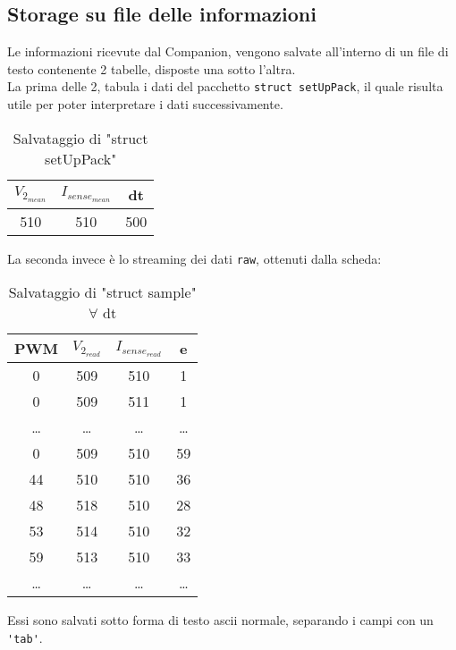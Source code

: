 \subsection{Storage su file delle informazioni}\label{subsec:experimentStorage}
Le informazioni ricevute dal Companion, vengono salvate all'interno di un file di testo contenente 2 tabelle, disposte una sotto l'altra.\\
La prima delle 2, tabula i dati del pacchetto \verb|struct setUpPack|, il quale risulta utile per poter interpretare i dati successivamente.
\begin{table}[h]
	\centering
	\caption[Salvataggio di "struct setUpPack"]{Salvataggio di "struct setUpPack"}
	\begin{tabular}[t]{|c|c|c|}
		\hline
		$ V_{2_{mean}} $ & $ I_{sense_{mean}}$ & dt  \\
		\hline
		510              & 510                 & 500 \\
		\hline
	\end{tabular}
\end{table}

\noindent
La seconda invece è lo streaming dei dati \verb|raw|, ottenuti dalla scheda:
\begin{table}[h]
	\centering
	\caption[Salvataggio di "struct sample" $\forall$ dt]{Salvataggio di "struct sample" $\forall$ dt}
	\begin{tabular}[t]{|c|c|c|c|}
		\hline
		PWM   & $ V_{2_{read}}$ & $ I_{sense_{read}}$ & e     \\
		\hline
		0     & 509             & 510                 & 1     \\
		0     & 509             & 511                 & 1     \\
		\dots & \dots           & \dots               & \dots \\
		0     & 509             & 510                 & 59    \\
		44    & 510             & 510                 & 36    \\
		48    & 518             & 510                 & 28    \\
		53    & 514             & 510                 & 32    \\
		59    & 513             & 510                 & 33    \\
		\dots & \dots           & \dots               & \dots \\
		\hline
	\end{tabular}

\end{table}
\noindent
Essi sono salvati sotto forma di testo ascii normale, separando i campi con un \verb|'tab'|.


